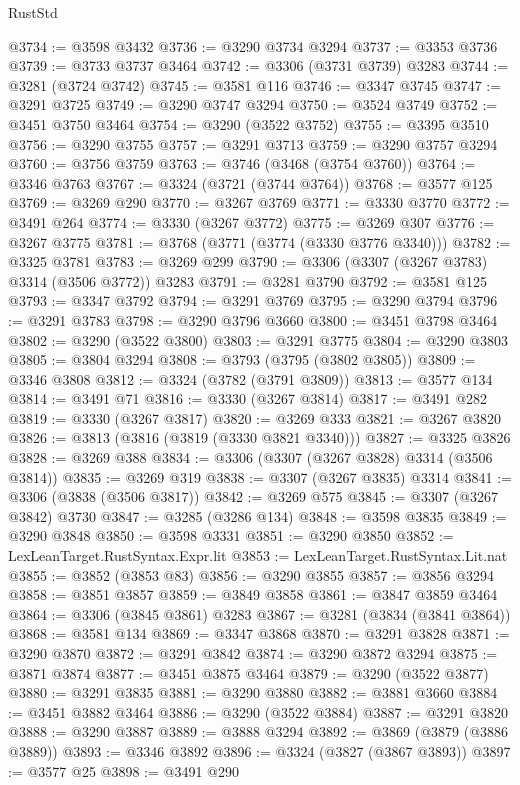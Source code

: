 \begin{lexlean}{RustStd}
\begin{coremodule}
@3734 := @3598 @3432
@3736 := @3290 @3734 @3294
@3737 := @3353 @3736
@3739 := @3733 @3737 @3464
@3742 := @3306 (@3731 @3739) @3283
@3744 := @3281 (@3724 @3742)
@3745 := @3581 @116
@3746 := @3347 @3745
@3747 := @3291 @3725
@3749 := @3290 @3747 @3294
@3750 := @3524 @3749
@3752 := @3451 @3750 @3464
@3754 := @3290 (@3522 @3752)
@3755 := @3395 @3510
@3756 := @3290 @3755
@3757 := @3291 @3713
@3759 := @3290 @3757 @3294
@3760 := @3756 @3759
@3763 := @3746 (@3468 (@3754 @3760))
@3764 := @3346 @3763
@3767 := @3324 (@3721 (@3744 @3764))
@3768 := @3577 @125
@3769 := @3269 @290
@3770 := @3267 @3769
@3771 := @3330 @3770
@3772 := @3491 @264
@3774 := @3330 (@3267 @3772)
@3775 := @3269 @307
@3776 := @3267 @3775
@3781 := @3768 (@3771 (@3774 (@3330 @3776 @3340)))
@3782 := @3325 @3781
@3783 := @3269 @299
@3790 := @3306 (@3307 (@3267 @3783) @3314 (@3506 @3772)) @3283
@3791 := @3281 @3790
@3792 := @3581 @125
@3793 := @3347 @3792
@3794 := @3291 @3769
@3795 := @3290 @3794
@3796 := @3291 @3783
@3798 := @3290 @3796 @3660
@3800 := @3451 @3798 @3464
@3802 := @3290 (@3522 @3800)
@3803 := @3291 @3775
@3804 := @3290 @3803
@3805 := @3804 @3294
@3808 := @3793 (@3795 (@3802 @3805))
@3809 := @3346 @3808
@3812 := @3324 (@3782 (@3791 @3809))
@3813 := @3577 @134
@3814 := @3491 @71
@3816 := @3330 (@3267 @3814)
@3817 := @3491 @282
@3819 := @3330 (@3267 @3817)
@3820 := @3269 @333
@3821 := @3267 @3820
@3826 := @3813 (@3816 (@3819 (@3330 @3821 @3340)))
@3827 := @3325 @3826
@3828 := @3269 @388
@3834 := @3306 (@3307 (@3267 @3828) @3314 (@3506 @3814))
@3835 := @3269 @319
@3838 := @3307 (@3267 @3835) @3314
@3841 := @3306 (@3838 (@3506 @3817))
@3842 := @3269 @575
@3845 := @3307 (@3267 @3842) @3730
@3847 := @3285 (@3286 @134)
@3848 := @3598 @3835
@3849 := @3290 @3848
@3850 := @3598 @3331
@3851 := @3290 @3850
@3852 := LexLeanTarget.RustSyntax.Expr.lit
@3853 := LexLeanTarget.RustSyntax.Lit.nat
@3855 := @3852 (@3853 @83)
@3856 := @3290 @3855
@3857 := @3856 @3294
@3858 := @3851 @3857
@3859 := @3849 @3858
@3861 := @3847 @3859 @3464
@3864 := @3306 (@3845 @3861) @3283
@3867 := @3281 (@3834 (@3841 @3864))
@3868 := @3581 @134
@3869 := @3347 @3868
@3870 := @3291 @3828
@3871 := @3290 @3870
@3872 := @3291 @3842
@3874 := @3290 @3872 @3294
@3875 := @3871 @3874
@3877 := @3451 @3875 @3464
@3879 := @3290 (@3522 @3877)
@3880 := @3291 @3835
@3881 := @3290 @3880
@3882 := @3881 @3660
@3884 := @3451 @3882 @3464
@3886 := @3290 (@3522 @3884)
@3887 := @3291 @3820
@3888 := @3290 @3887
@3889 := @3888 @3294
@3892 := @3869 (@3879 (@3886 @3889))
@3893 := @3346 @3892
@3896 := @3324 (@3827 (@3867 @3893))
@3897 := @3577 @25
@3898 := @3491 @290

\end{coremodule}
\end{lexlean}
